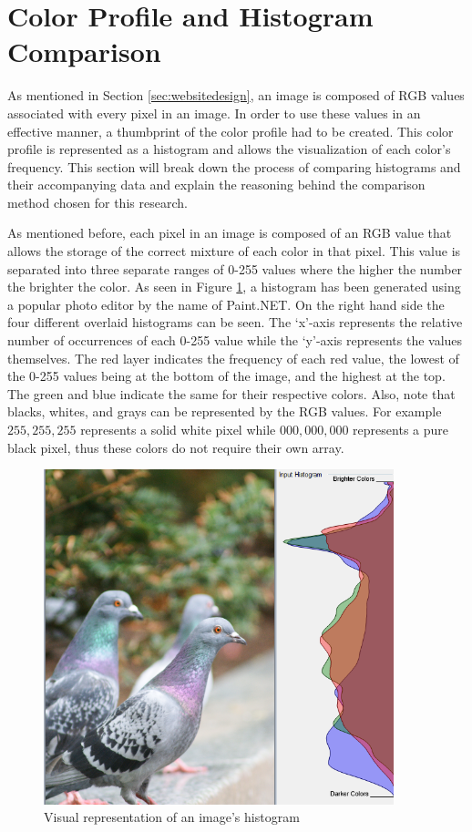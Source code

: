 \section{Color Profile and Histogram Comparison} \label{sec:histogram}
As mentioned in Section \ref{sec:websitedesign}, an image is composed of RGB values associated with every pixel in an image. In order to use these values in an effective manner, a thumbprint of the color profile had to be created. This color profile is represented as a histogram and allows the visualization of each color's frequency. This section will break down the process of comparing histograms and their accompanying data and explain the reasoning behind the comparison method chosen for this research.

As mentioned before, each pixel in an image is composed of an RGB value that allows the storage of the correct mixture of each color in that pixel. This value is separated into three separate ranges of 0-255 values where the higher the number the brighter the color. As seen in Figure \ref{historep}, a histogram has been generated using a popular photo editor by the name of Paint.NET. On the right hand side the four different overlaid histograms can be seen. The `x'-axis represents the relative number of occurrences of each 0-255 value while the `y'-axis represents the values themselves. The red layer indicates the frequency of each red value, the lowest of the 0-255 values being at the bottom of the image, and the highest at the top. The green and blue indicate the same for their respective colors. Also, note that blacks, whites, and grays can be represented by the RGB values. For example $255,255,255$ represents a solid white pixel while $000,000,000$ represents a pure black pixel, thus these colors do not require their own array.

\begin{figure}[htbp]
\centering
\includegraphics[width=4in]{historep}
\caption{Visual representation of an image's histogram}
\label{historep}
\end{figure}

